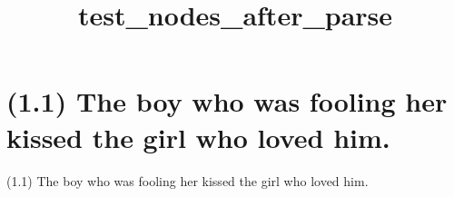 \documentclass{article}
\begin{document}
%
%

\title{\textbf{test\_nodes\_after\_parse}}
\maketitle

\clearpage

%
%

\section*{(1.1) The boy who was fooling her kissed the girl who loved him.}

\bigbreak
\begin{enumerate*}
\item[(1.1)] The boy who was fooling her kissed the girl who loved him.
\end{enumerate*}
\bigbreak
\end{document}
